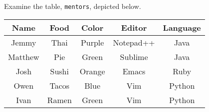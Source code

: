 Examine the table, \texttt{mentors}, depicted below.

\begin{center}
\begin{tabular}{|c|c|c|c|c|}
 \hline
 \textbf{Name} & \textbf{Food} & \textbf{Color} & \textbf{Editor} & \textbf{Language} \\
 \hline
 Jemmy & Thai & Purple & Notepad++ & Java \\
 \hline
 Matthew & Pie & Green & Sublime & Java \\
 \hline
 Josh & Sushi & Orange & Emacs & Ruby \\
 \hline
 Owen & Tacos & Blue & Vim & Python \\
 \hline
 Ivan & Ramen & Green & Vim & Python \\
 \hline
\end{tabular}
\end{center}
